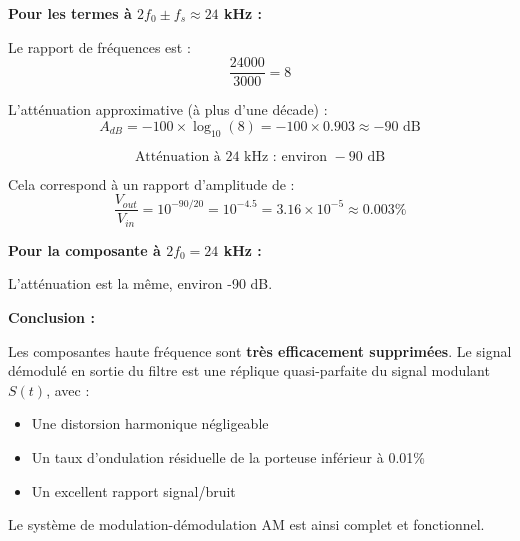 \documentclass[11pt,a4paper]{article}
\begin{document}
\textbf{Pour les termes à $2f_0 \pm f_s \approx 24$ kHz :}

Le rapport de fréquences est :
\begin{equation}
\frac{24000}{3000} = 8
\end{equation}

L'atténuation approximative (à plus d'une décade) :
\begin{equation}
A_{dB} = -100 \times \log_{10}(8) = -100 \times 0.903 \approx -90 \text{ dB}
\end{equation}

\begin{equation}
\boxed{\text{Atténuation à 24 kHz : environ } -90 \text{ dB}}
\end{equation}

Cela correspond à un rapport d'amplitude de :
\begin{equation}
\frac{V_{out}}{V_{in}} = 10^{-90/20} = 10^{-4.5} = 3.16 \times 10^{-5} \approx 0.003\%
\end{equation}

\textbf{Pour la composante à $2f_0 = 24$ kHz :}

L'atténuation est la même, environ -90 dB.

\textbf{Conclusion :}

Les composantes haute fréquence sont \textbf{très efficacement supprimées}. Le signal démodulé en sortie du filtre est une réplique quasi-parfaite du signal modulant $S(t)$, avec :
\begin{itemize}
    \item Une distorsion harmonique négligeable
    \item Un taux d'ondulation résiduelle de la porteuse inférieur à 0.01\%
    \item Un excellent rapport signal/bruit
\end{itemize}

Le système de modulation-démodulation AM est ainsi complet et fonctionnel.

\vspace{1cm}
\end{document}
